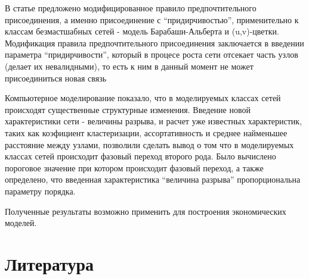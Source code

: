 \documentclass[10pt,aps,pra]{revtex4-1}
\begin{document}
В статье предложено модифицированное правило предпочтительного присоединения, а именно присоединение с ``придирчивостью'', применительно к классам безмастшабных сетей - модель Барабаши-Альберта и (u,v)-цветки. Модификация правила предпочтительного присоединения заключается в введении параметра ``придирчивости'', который в процесе роста сети отсекает часть узлов (делает их невалидными),  то есть к ним в данный момент не может присоединиться новая связь

Компьютерное моделирование показало, что в моделируемых классах сетей происходят существенные структурные изменения. Введение новой характеристики сети - величины разрыва, и расчет уже известных характеристик, таких как коэфициент кластеризации, ассортативность и среднее найменьшее расстояние между узлами, позволили сделать вывод о том что в моделируемых классах сетей происходит фазовый переход второго рода. Было вычислено пороговое значение при котором происходит фазовый переход, а также определено, что введенная характеристика ``величина разрыва'' пропорциональна параметру порядка.

Полученные результаты возможно применить для построения экономических моделей. 

\section{Литература}


 
\end{document}
